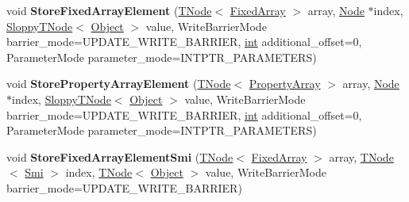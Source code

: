 \begin{DoxyCompactItemize}
\item 
\mbox{\label{classv8_1_1internal_1_1CodeStubAssembler_a4588b0d1eaf446a00314d5c0dbe101b5}} 
void {\bfseries Store\+Fixed\+Array\+Element} (\mbox{\hyperlink{classv8_1_1internal_1_1compiler_1_1TNode}{T\+Node}}$<$ \mbox{\hyperlink{classv8_1_1internal_1_1FixedArray}{Fixed\+Array}} $>$ array, \mbox{\hyperlink{classv8_1_1internal_1_1compiler_1_1Node}{Node}} $\ast$index, \mbox{\hyperlink{classv8_1_1internal_1_1compiler_1_1SloppyTNode}{Sloppy\+T\+Node}}$<$ \mbox{\hyperlink{classv8_1_1internal_1_1Object}{Object}} $>$ value, Write\+Barrier\+Mode barrier\+\_\+mode=U\+P\+D\+A\+T\+E\+\_\+\+W\+R\+I\+T\+E\+\_\+\+B\+A\+R\+R\+I\+ER, \mbox{\hyperlink{classint}{int}} additional\+\_\+offset=0, Parameter\+Mode parameter\+\_\+mode=I\+N\+T\+P\+T\+R\+\_\+\+P\+A\+R\+A\+M\+E\+T\+E\+RS)
\item 
\mbox{\label{classv8_1_1internal_1_1CodeStubAssembler_a0d07c45cda5dbfc95380772fa1e97d7d}} 
void {\bfseries Store\+Property\+Array\+Element} (\mbox{\hyperlink{classv8_1_1internal_1_1compiler_1_1TNode}{T\+Node}}$<$ \mbox{\hyperlink{classv8_1_1internal_1_1PropertyArray}{Property\+Array}} $>$ array, \mbox{\hyperlink{classv8_1_1internal_1_1compiler_1_1Node}{Node}} $\ast$index, \mbox{\hyperlink{classv8_1_1internal_1_1compiler_1_1SloppyTNode}{Sloppy\+T\+Node}}$<$ \mbox{\hyperlink{classv8_1_1internal_1_1Object}{Object}} $>$ value, Write\+Barrier\+Mode barrier\+\_\+mode=U\+P\+D\+A\+T\+E\+\_\+\+W\+R\+I\+T\+E\+\_\+\+B\+A\+R\+R\+I\+ER, \mbox{\hyperlink{classint}{int}} additional\+\_\+offset=0, Parameter\+Mode parameter\+\_\+mode=I\+N\+T\+P\+T\+R\+\_\+\+P\+A\+R\+A\+M\+E\+T\+E\+RS)
\item 
\mbox{\label{classv8_1_1internal_1_1CodeStubAssembler_a4c42b8396a88c8efecb3ca01f0746b7a}} 
void {\bfseries Store\+Fixed\+Array\+Element\+Smi} (\mbox{\hyperlink{classv8_1_1internal_1_1compiler_1_1TNode}{T\+Node}}$<$ \mbox{\hyperlink{classv8_1_1internal_1_1FixedArray}{Fixed\+Array}} $>$ array, \mbox{\hyperlink{classv8_1_1internal_1_1compiler_1_1TNode}{T\+Node}}$<$ \mbox{\hyperlink{classv8_1_1internal_1_1Smi}{Smi}} $>$ index, \mbox{\hyperlink{classv8_1_1internal_1_1compiler_1_1TNode}{T\+Node}}$<$ \mbox{\hyperlink{classv8_1_1internal_1_1Object}{Object}} $>$ value, Write\+Barrier\+Mode barrier\+\_\+mode=U\+P\+D\+A\+T\+E\+\_\+\+W\+R\+I\+T\+E\+\_\+\+B\+A\+R\+R\+I\+ER)

\end{DoxyCompactItemize}
